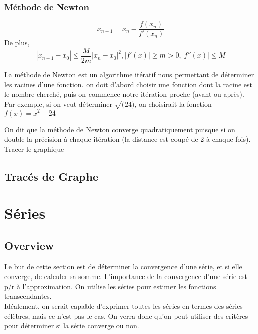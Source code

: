 \documentclass{article}
\begin{document}
\subsubsection{Méthode de Newton}

\begin{theorem}
    $$ x_{n+1} = x_n - \frac{f(x_n)}{f'(x_n)} $$
    De plus,
    $$ | x_{n+1} - x_0 | \leq \frac{M}{2m} |x_n - x_0| ^2,
    |f'(x)| \geq m > 0, |f''(x)| \leq M$$
\end{theorem}

\begin{remark}
    La méthode de Newton est un algorithme itératif nous permettant
    de déterminer les racines d'une fonction. on doit d'abord choisir
    une fonction dont la racine est le nombre cherché, puis on commence
    notre itération proche (avant ou après). Par exemple, si on veut
    déterminer $\sqrt(24)$, on choisirait la fonction $ f(x) = x^2 - 24$
\end{remark}

\begin{remark}
    On dit que la méthode de Newton converge quadratiquement puisque
    si on double la précision à chaque itération (la distance est coupé
    de 2 à chaque fois). Tracer le graphique
\end{remark}

\subsection{Tracés de Graphe}

\pagebreak

\section{Séries}

\subsection{Overview}

Le but de cette section est de déterminer la convergence d'une
série, et si elle converge, de calculer sa somme. L'importance de
la convergence d'une série est p/r à l'approximation. On utilise
les séries pour estimer les fonctions transcendantes.\\

Idéalement, on serait capable d'exprimer toutes les séries en
termes des séries célèbres, mais ce n'est pas le cas. On verra donc
qu'on peut utiliser des critères pour déterminer si la série converge
ou non.
\end{document}
